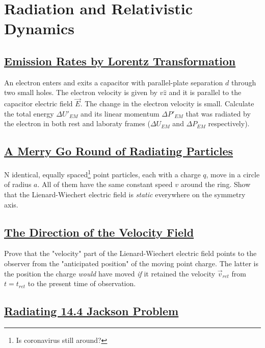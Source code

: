 
\section{Radiation and Relativistic Dynamics}

\subsection{\hyperref[Emission Rates by Lorentz Transformation]{Emission Rates by Lorentz Transformation}}

An electron enters and exits a capacitor with parallel-plate separation $d$ through two small holes. The electron velocity is given by $v \hat{z}$ and it is parallel to the capacitor electric field $\vec{E}$. The change in the electron velocity is small. Calculate the total energy $\Delta U'_{EM}$ and its linear momentum $\Delta P'_{EM}$ that was radiated by the electron in both rest and laboraty frames ($\Delta U_{EM}$ and  $\Delta P_{EM}$ respectively).

\subsection{\hyperref[A Merry Go Round of Radiating Particles]{A Merry Go Round of Radiating Particles}}

N identical, equally spaced\footnote{Is coronavirus still around?} point particles, each with a charge $q$, move in a circle of radius $a$. All of them have the same constant speed $v$ around the ring. Show that the Lienard-Wiechert electric field is \textit{static} everywhere on the symmetry axis.

\subsection{\hyperref[The Direction of the Velocity Field]{The Direction of the Velocity Field}}

Prove that the "velocity" part of the Lienard-Wiechert electric field points to the observer from the "anticipated position" of the moving point charge. The latter is the position the charge \textit{would} have moved \textit{if} it retained the velocity $\vec{v}_{ret}$ from $t = t_{ret}$ to the present time of observation.

\subsection{\hyperref[Radiating 14.4 Jackson Problem]{Radiating 14.4 Jackson Problem}}


